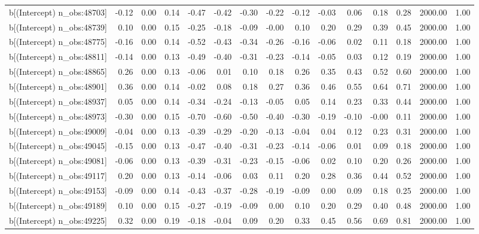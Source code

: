 \begin{table}[ht]
\begin{tabular}{rrrrrrrrrrrrrrr}
  b[(Intercept) n\_obs:48703] & -0.12 & 0.00 & 0.14 & -0.47 & -0.42 & -0.30 & -0.22 & -0.12 & -0.03 & 0.06 & 0.18 & 0.28 & 2000.00 & 1.00 \\ 
  b[(Intercept) n\_obs:48739] & 0.10 & 0.00 & 0.15 & -0.25 & -0.18 & -0.09 & -0.00 & 0.10 & 0.20 & 0.29 & 0.39 & 0.45 & 2000.00 & 1.00 \\ 
  b[(Intercept) n\_obs:48775] & -0.16 & 0.00 & 0.14 & -0.52 & -0.43 & -0.34 & -0.26 & -0.16 & -0.06 & 0.02 & 0.11 & 0.18 & 2000.00 & 1.00 \\ 
  b[(Intercept) n\_obs:48811] & -0.14 & 0.00 & 0.13 & -0.49 & -0.40 & -0.31 & -0.23 & -0.14 & -0.05 & 0.03 & 0.12 & 0.19 & 2000.00 & 1.00 \\ 
  b[(Intercept) n\_obs:48865] & 0.26 & 0.00 & 0.13 & -0.06 & 0.01 & 0.10 & 0.18 & 0.26 & 0.35 & 0.43 & 0.52 & 0.60 & 2000.00 & 1.00 \\ 
  b[(Intercept) n\_obs:48901] & 0.36 & 0.00 & 0.14 & -0.02 & 0.08 & 0.18 & 0.27 & 0.36 & 0.46 & 0.55 & 0.64 & 0.71 & 2000.00 & 1.00 \\ 
  b[(Intercept) n\_obs:48937] & 0.05 & 0.00 & 0.14 & -0.34 & -0.24 & -0.13 & -0.05 & 0.05 & 0.14 & 0.23 & 0.33 & 0.44 & 2000.00 & 1.00 \\ 
  b[(Intercept) n\_obs:48973] & -0.30 & 0.00 & 0.15 & -0.70 & -0.60 & -0.50 & -0.40 & -0.30 & -0.19 & -0.10 & -0.00 & 0.11 & 2000.00 & 1.00 \\ 
  b[(Intercept) n\_obs:49009] & -0.04 & 0.00 & 0.13 & -0.39 & -0.29 & -0.20 & -0.13 & -0.04 & 0.04 & 0.12 & 0.23 & 0.31 & 2000.00 & 1.00 \\ 
  b[(Intercept) n\_obs:49045] & -0.15 & 0.00 & 0.13 & -0.47 & -0.40 & -0.31 & -0.23 & -0.14 & -0.06 & 0.01 & 0.09 & 0.18 & 2000.00 & 1.00 \\ 
  b[(Intercept) n\_obs:49081] & -0.06 & 0.00 & 0.13 & -0.39 & -0.31 & -0.23 & -0.15 & -0.06 & 0.02 & 0.10 & 0.20 & 0.26 & 2000.00 & 1.00 \\ 
  b[(Intercept) n\_obs:49117] & 0.20 & 0.00 & 0.13 & -0.14 & -0.06 & 0.03 & 0.11 & 0.20 & 0.28 & 0.36 & 0.44 & 0.52 & 2000.00 & 1.00 \\ 
  b[(Intercept) n\_obs:49153] & -0.09 & 0.00 & 0.14 & -0.43 & -0.37 & -0.28 & -0.19 & -0.09 & 0.00 & 0.09 & 0.18 & 0.25 & 2000.00 & 1.00 \\ 
  b[(Intercept) n\_obs:49189] & 0.10 & 0.00 & 0.15 & -0.27 & -0.19 & -0.09 & 0.00 & 0.10 & 0.20 & 0.29 & 0.40 & 0.48 & 2000.00 & 1.00 \\ 
  b[(Intercept) n\_obs:49225] & 0.32 & 0.00 & 0.19 & -0.18 & -0.04 & 0.09 & 0.20 & 0.33 & 0.45 & 0.56 & 0.69 & 0.81 & 2000.00 & 1.00 \\ 

\end{tabular}
\end{table}
